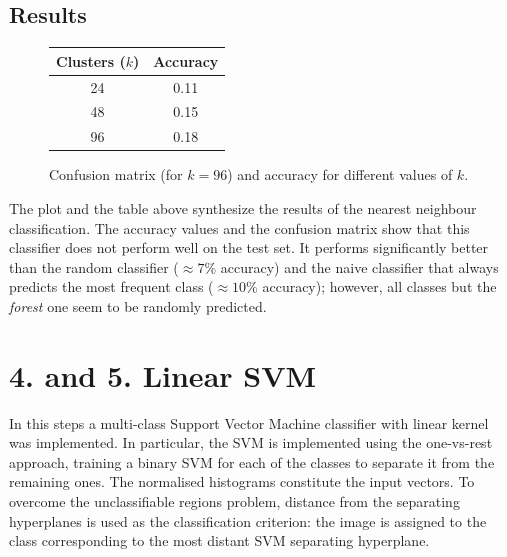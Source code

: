\documentclass[12pt]{article}
\begin{document}
  \subsection*{Results}

  \begin{figure}[H]
    \centering
    \caption*{Confusion matrix (for \( k = 96 \)) and accuracy for different values of \( k \).}
    \quad\quad\quad
    \begin{tabular}[b]{cc}
			\toprule
      Clusters (\( k \)) & Accuracy \\
      \midrule
      24  & 0.11 \\
      48  & 0.15 \\
      96  & 0.18 \\
      \bottomrule
    \end{tabular}
  \end{figure}

  The plot and the table above synthesize the results of the nearest neighbour classification. The accuracy values and the confusion matrix show that this classifier does not perform well on the test set. It performs significantly better than the random classifier (\( \approx 7\% \) accuracy) and the naive classifier that always predicts the most frequent class (\( \approx 10\% \) accuracy); however, all classes but the \textit{forest} one seem to be randomly predicted.



  \section*{4. and 5. Linear SVM}

  In this steps a multi-class Support Vector Machine classifier with linear kernel was implemented. In particular, the SVM is implemented using the one-vs-rest approach, training a binary SVM for each of the classes to separate it from the remaining ones. The normalised histograms constitute the input vectors. To overcome the unclassifiable regions problem, distance from the separating hyperplanes is used as the classification criterion: the image is assigned to the class corresponding to the most distant SVM separating hyperplane.
\end{document}
